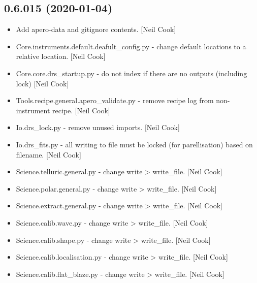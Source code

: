 \documentclass[a4paper,10pt,english]{report}
\begin{document}
\subsection{0.6.015 (2020-01-04)}
\label{\detokenize{misc/changelog:id2}}\begin{itemize}
\item {} 
Add apero-data and gitignore contents. {[}Neil Cook{]}

\item {} 
Core.instruments.default.deafult\_config.py - change default locations
to a relative location. {[}Neil Cook{]}

\item {} 
Core.core.drs\_startup.py - do not index if there are no outputs
(including lock) {[}Neil Cook{]}

\item {} 
Tools.recipe.general.apero\_validate.py - remove recipe log from non-
instrument recipe. {[}Neil Cook{]}

\item {} 
Io.drs\_lock.py - remove unused imports. {[}Neil Cook{]}

\item {} 
Io.drs\_fits.py - all writing to file must be locked (for
parellisation) based on filename. {[}Neil Cook{]}

\item {} 
Science.telluric.general.py - change write \textendash{}\textgreater{} write\_file. {[}Neil Cook{]}

\item {} 
Science.polar.general.py - change write \textendash{}\textgreater{} write\_file. {[}Neil Cook{]}

\item {} 
Science.extract.general.py - change write \textendash{}\textgreater{} write\_file. {[}Neil Cook{]}

\item {} 
Science.calib.wave.py - change write \textendash{}\textgreater{} write\_file. {[}Neil Cook{]}

\item {} 
Science.calib.shape.py - change write \textendash{}\textgreater{} write\_file. {[}Neil Cook{]}

\item {} 
Science.calib.localisation.py - change write \textendash{}\textgreater{} write\_file. {[}Neil
Cook{]}

\item {} 
Science.calib.flat\_blaze.py - change write \textendash{}\textgreater{} write\_file. {[}Neil Cook{]}


\end{itemize}
\end{document}
